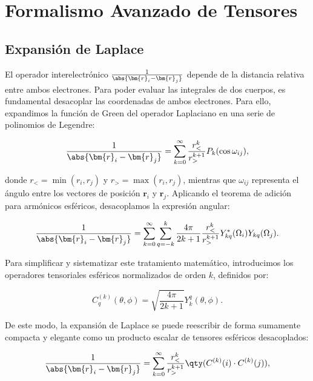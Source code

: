 \chapter{Formalismo Avanzado de Tensores}
\label{ap:tensores}

\section{Expansión de Laplace}

El operador interelectrónico \( \frac{1}{\abs{\bm{r}_i-\bm{r}_j}} \) depende de la distancia relativa entre ambos electrones. Para poder evaluar las integrales de dos cuerpos, es fundamental desacoplar las coordenadas de ambos electrones. Para ello, expandimos la función de Green del operador Laplaciano en una serie de polinomios de Legendre:

\begin{equation}
  \label{eq:laplace}
  \frac{1}{\abs{\bm{r}_i-\bm{r}_j}} = \sum_{k=0}^{\infty} \frac{r_{<}^k}{r_{>}^{k+1}} P_k(\cos\omega_{ij}),
\end{equation}

donde \( r_{<} = \min(r_i, r_j) \) y \( r_{>} = \max(r_i, r_j) \), mientras que \( \omega_{ij} \) representa el ángulo entre los vectores de posición \( \bm{r}_i \) y \( \bm{r}_j \). Aplicando el teorema de adición para armónicos esféricos, desacoplamos la expresión angular:

\begin{equation}
  \label{eq:laplace-harm}
  \frac{1}{\abs{\bm{r}_i-\bm{r}_j}} = \sum_{k=0}^{\infty} \sum_{q=-k}^k \frac{4\pi}{2k+1} \frac{r_{<}^k}{r_{>}^{k+1}} Y_{kq}^{*}(\Omega_i) Y_{kq}(\Omega_j).
\end{equation}

Para simplificar y sistematizar este tratamiento matemático, introducimos los operadores tensoriales esféricos normalizados de orden \( k \), definidos por:

\begin{equation}
  C_q^{(k)}(\theta, \phi) = \sqrt{\frac{4\pi}{2k+1}} Y_k^q(\theta, \phi).
\end{equation}

De este modo, la expansión de Laplace se puede reescribir de forma sumamente compacta y elegante como un producto escalar de tensores esféricos desacoplados:

\begin{equation}
  \frac{1}{\abs{\bm{r}_i-\bm{r}_j}} = \sum_{k=0}^{\infty} \frac{r_{<}^k}{r_{>}^{k+1}} \qty( C^{(k)}(i) \cdot C^{(k)}(j) ),
\end{equation}

